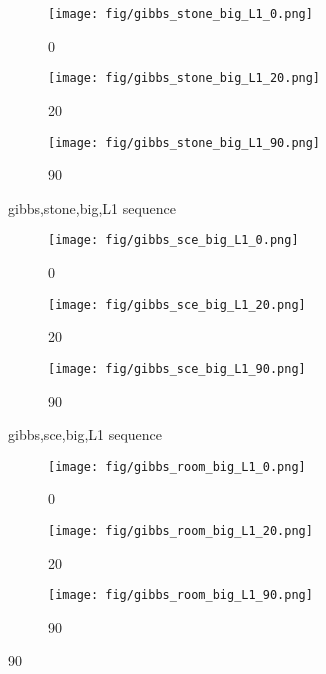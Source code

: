 \begin{figure} 
    \centering
    \begin{subfigure}[b]{0.3\textwidth}
    \texttt{[image: fig/gibbs\_stone\_big\_L1\_0.png]}
    \caption{0}
    \label{fig:image1}
  \end{subfigure}
  \hfill
  \begin{subfigure}[b]{0.3\textwidth}
    \texttt{[image: fig/gibbs\_stone\_big\_L1\_20.png]}
    \caption{20}
    \label{fig:image2}
  \end{subfigure}
  \hfill
  \begin{subfigure}[b]{0.3\textwidth}
    \texttt{[image: fig/gibbs\_stone\_big\_L1\_90.png]}
    \caption{90}
    \label{fig:image3}
  \end{subfigure}

  \caption{gibbs,stone,big,L1 sequence}
  \label{fig:three_images}
\end{figure}\begin{figure} 
    \centering
    \begin{subfigure}[b]{0.3\textwidth}
    \texttt{[image: fig/gibbs\_sce\_big\_L1\_0.png]}
    \caption{0}
    \label{fig:image1}
  \end{subfigure}
  \hfill
  \begin{subfigure}[b]{0.3\textwidth}
    \texttt{[image: fig/gibbs\_sce\_big\_L1\_20.png]}
    \caption{20}
    \label{fig:image2}
  \end{subfigure}
  \hfill
  \begin{subfigure}[b]{0.3\textwidth}
    \texttt{[image: fig/gibbs\_sce\_big\_L1\_90.png]}
    \caption{90}
    \label{fig:image3}
  \end{subfigure}

  \caption{gibbs,sce,big,L1 sequence}
  \label{fig:three_images}
\end{figure}\begin{figure} 
    \centering
    \begin{subfigure}[b]{0.3\textwidth}
    \texttt{[image: fig/gibbs\_room\_big\_L1\_0.png]}
    \caption{0}
    \label{fig:image1}
  \end{subfigure}
  \hfill
  \begin{subfigure}[b]{0.3\textwidth}
    \texttt{[image: fig/gibbs\_room\_big\_L1\_20.png]}
    \caption{20}
    \label{fig:image2}
  \end{subfigure}
  \hfill
  \begin{subfigure}[b]{0.3\textwidth}
    \texttt{[image: fig/gibbs\_room\_big\_L1\_90.png]}
    \caption{90}
    \label{fig:image3}
  \end{subfigure}


\end{figure}
